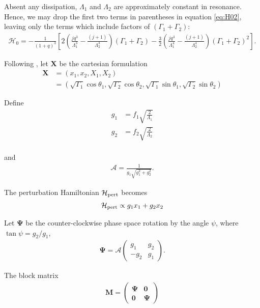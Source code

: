 \documentclass[usenatbib,twocolumn]{mnras}
\renewcommand{\v}[1]{\boldsymbol{ #1 }}
\begin{document}
\noindent Absent any dissipation, \(\Lambda_1\) and
\(\Lambda_2\) are approximately constant in resonance.  Hence, we may
drop the first two terms in parentheses in equation \eqref{eq:H02},
leaving only the terms which include factors of \((\Gamma_1+\Gamma_2)\):
\begin{align}
  \label{eq:H03}
  \mathcal{H}_0
  = -\frac{1}{(1+q)^3}\left[
   2\left(
     \frac{jq^3}{\Lambda_1^3} - \frac{(j+1)}{\Lambda_2^3}
     \right)(\Gamma_1+\Gamma_2)
   -\frac32\left( 
     \frac{jq^3}{\Lambda_1^4} - \frac{(j+1)}{\Lambda_2^4}\right)
     (\Gamma_1+\Gamma_2)^2
     \right].
\end{align}

Following \citet{henrard86_reduc_trans_apocen_librat}
\citep[equivalently, ][]{wisdom_canonical_1986,moutamid14_coupl_between_corot_lindb_reson}, let \(\v X\) be the
cartesian formulation
\begin{align}
  \v X &= (x_1, x_2, X_1, X_2)\nonumber\\
  &= (\sqrt{\Gamma_1}\cos\theta_1, \sqrt{\Gamma_2}\cos\theta_2,
    \sqrt{\Gamma_1}\sin\theta_1, \sqrt{\Gamma_2}\sin\theta_2)
\end{align}

\noindent 
Define
\begin{align}
    g_1 &= f_1\sqrt{\frac{2}{\Lambda_1}} \\
    g_2 &= f_2\sqrt{\frac{2}{\Lambda_2}} \\
\end{align}

\noindent and
\begin{align}
  \mathcal{A} = \frac{1}{g_1\sqrt{g_1^2+g_2^2}}.
\end{align}

\noindent The perturbation Hamiltonian \(\mathcal H_{\rm
pert}\) becomes
\begin{align}
  \mathcal H_{\rm pert} \propto g_1 x_1 + g_2 x_2
\end{align}

\noindent
Let \(\v \Psi\) be the
counter-clockwise phase space rotation by the angle \(\psi\), where \(\tan\psi=
g_2/g_1\),
\begin{align}
  \v \Psi =  \mathcal{A}
  \begin{pmatrix}
    g_1 & g_2 \\
    -g_2 & g_1 
  \end{pmatrix}.
\end{align}

\noindent The block matrix
\begin{align}
  \v M =
  \begin{pmatrix}
    \v \Psi & \v 0 \\
    \v 0 & \v \Psi
  \end{pmatrix}
\end{align}
\end{document}
